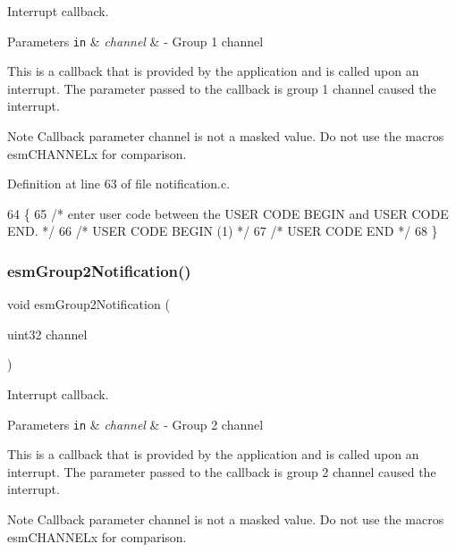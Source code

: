 Interrupt callback. 


\begin{DoxyParams}[1]{Parameters}
\mbox{\tt in}  & {\em channel} & -\/ Group 1 channel\\
\hline
\end{DoxyParams}
This is a callback that is provided by the application and is called upon an interrupt. The parameter passed to the callback is group 1 channel caused the interrupt. \begin{DoxyNote}{Note}
Callback parameter channel is not a masked value. Do not use the macros esm\+C\+H\+A\+N\+N\+E\+Lx for comparison. 
\end{DoxyNote}


Definition at line 63 of file notification.\+c.


\begin{DoxyCode}
64 \{
65 \textcolor{comment}{/*  enter user code between the USER CODE BEGIN and USER CODE END. */}
66 \textcolor{comment}{/* USER CODE BEGIN (1) */}
67 \textcolor{comment}{/* USER CODE END */}
68 \}
\end{DoxyCode}
\mbox{\label{group__ESM_ga7d5d25716f0d945f9d5ae0e6ae387d67}} 
\subsubsection{\texorpdfstring{esm\+Group2\+Notification()}{esmGroup2Notification()}}
{\footnotesize\ttfamily void esm\+Group2\+Notification (\begin{DoxyParamCaption}\item[{uint32}]{channel }\end{DoxyParamCaption})}



Interrupt callback. 


\begin{DoxyParams}[1]{Parameters}
\mbox{\tt in}  & {\em channel} & -\/ Group 2 channel\\
\hline
\end{DoxyParams}
This is a callback that is provided by the application and is called upon an interrupt. The parameter passed to the callback is group 2 channel caused the interrupt. \begin{DoxyNote}{Note}
Callback parameter channel is not a masked value. Do not use the macros esm\+C\+H\+A\+N\+N\+E\+Lx for comparison. 
\end{DoxyNote}


